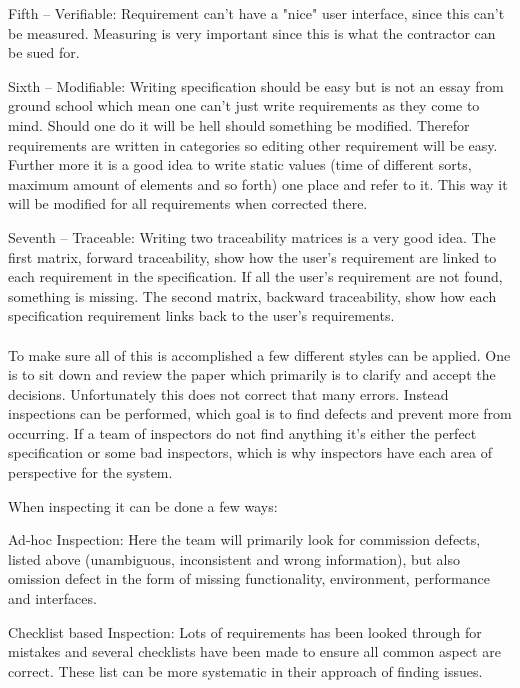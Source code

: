 \documentclass[Main]{subfiles}
\begin{document}
Fifth -- Verifiable:
Requirement can't have a "nice" user interface, since this can't be measured.
Measuring is very important since this is what the contractor can be sued for.

Sixth -- Modifiable:
Writing specification should be easy but is not an essay from ground school which mean one can't just write requirements as they come to mind.
Should one do it will be hell should something be modified.
Therefor requirements are written in categories so editing other requirement will be easy.
Further more it is a good idea to write static values (time of different sorts, maximum amount of elements and so forth) one place and refer to it.
This way it will be modified for all requirements when corrected there.

Seventh -- Traceable:
Writing two traceability matrices is a very good idea.
The first matrix, forward traceability, show how the user's requirement are linked to each requirement in the specification.
If all the user's requirement are not found, something is missing.
The second matrix, backward traceability, show how each specification requirement links back to the user's requirements.
\\
\\
To make sure all of this is accomplished a few different styles can be applied.
One is to sit down and review the paper which primarily is to clarify and accept the decisions.
Unfortunately this does not correct that many errors. 
Instead inspections can be performed, which goal is to find defects and prevent more from occurring.
If a team of inspectors do not find anything it's either the perfect specification or some bad inspectors, which is why inspectors have each area of perspective for the system. 

When inspecting it can be done a few ways:


Ad-hoc Inspection:
Here the team will primarily look for commission defects, listed above (unambiguous, inconsistent and wrong information), but also omission defect in the form of missing functionality, environment, performance and interfaces.


Checklist based Inspection:
Lots of requirements has been looked through for mistakes and several checklists have been made to ensure all common aspect are correct. 
These list can be more systematic in their approach of finding issues.
\end{document}
